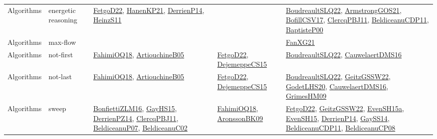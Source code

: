 {\begin{longtable}{lp{3cm}>{\raggedright}p{6cm}>{\raggedright}p{6cm}p{8cm}}
Algorithms & energetic reasoning & \href{articles/FetgoD22.pdf}{FetgoD22}\cite{FetgoD22}, \href{papers/HanenKP21.pdf}{HanenKP21}\cite{HanenKP21}, \href{papers/DerrienP14.pdf}{DerrienP14}\cite{DerrienP14}, \href{papers/HeinzS11.pdf}{HeinzS11}\cite{HeinzS11} &  & \href{papers/BoudreaultSLQ22.pdf}{BoudreaultSLQ22}\cite{BoudreaultSLQ22}, \href{papers/ArmstrongGOS21.pdf}{ArmstrongGOS21}\cite{ArmstrongGOS21}, \href{papers/BofillCSV17.pdf}{BofillCSV17}\cite{BofillCSV17}, \href{papers/ClercqPBJ11.pdf}{ClercqPBJ11}\cite{ClercqPBJ11}, \href{articles/BeldiceanuCDP11.pdf}{BeldiceanuCDP11}\cite{BeldiceanuCDP11}, \href{articles/BaptisteP00.pdf}{BaptisteP00}\cite{BaptisteP00}\\
Algorithms & max-flow &  &  & \href{articles/FanXG21.pdf}{FanXG21}\cite{FanXG21}\\
Algorithms & not-first & \href{articles/FahimiOQ18.pdf}{FahimiOQ18}\cite{FahimiOQ18}, \href{papers/ArtiouchineB05.pdf}{ArtiouchineB05}\cite{ArtiouchineB05} & \href{articles/FetgoD22.pdf}{FetgoD22}\cite{FetgoD22}, \href{papers/DejemeppeCS15.pdf}{DejemeppeCS15}\cite{DejemeppeCS15} & \href{papers/BoudreaultSLQ22.pdf}{BoudreaultSLQ22}\cite{BoudreaultSLQ22}, \href{papers/CauwelaertDMS16.pdf}{CauwelaertDMS16}\cite{CauwelaertDMS16}\\
Algorithms & not-last & \href{articles/FahimiOQ18.pdf}{FahimiOQ18}\cite{FahimiOQ18}, \href{papers/ArtiouchineB05.pdf}{ArtiouchineB05}\cite{ArtiouchineB05} & \href{articles/FetgoD22.pdf}{FetgoD22}\cite{FetgoD22}, \href{papers/DejemeppeCS15.pdf}{DejemeppeCS15}\cite{DejemeppeCS15} & \href{papers/BoudreaultSLQ22.pdf}{BoudreaultSLQ22}\cite{BoudreaultSLQ22}, \href{papers/GeitzGSSW22.pdf}{GeitzGSSW22}\cite{GeitzGSSW22}, \href{papers/GodetLHS20.pdf}{GodetLHS20}\cite{GodetLHS20}, \href{papers/CauwelaertDMS16.pdf}{CauwelaertDMS16}\cite{CauwelaertDMS16}, \href{papers/GrimesHM09.pdf}{GrimesHM09}\cite{GrimesHM09}\\
Algorithms & sweep & \href{papers/BonfiettiZLM16.pdf}{BonfiettiZLM16}\cite{BonfiettiZLM16}, \href{papers/GayHS15.pdf}{GayHS15}\cite{GayHS15}, \href{papers/DerrienPZ14.pdf}{DerrienPZ14}\cite{DerrienPZ14}, \href{papers/ClercqPBJ11.pdf}{ClercqPBJ11}\cite{ClercqPBJ11}, \href{papers/BeldiceanuP07.pdf}{BeldiceanuP07}\cite{BeldiceanuP07}, \href{papers/BeldiceanuC02.pdf}{BeldiceanuC02}\cite{BeldiceanuC02} & \href{articles/FahimiOQ18.pdf}{FahimiOQ18}\cite{FahimiOQ18}, \href{papers/AronssonBK09.pdf}{AronssonBK09}\cite{AronssonBK09} & \href{articles/FetgoD22.pdf}{FetgoD22}\cite{FetgoD22}, \href{papers/GeitzGSSW22.pdf}{GeitzGSSW22}\cite{GeitzGSSW22}, \href{articles/EvenSH15a.pdf}{EvenSH15a}\cite{EvenSH15a}, \href{papers/EvenSH15.pdf}{EvenSH15}\cite{EvenSH15}, \href{papers/DerrienP14.pdf}{DerrienP14}\cite{DerrienP14}, \href{papers/GaySS14.pdf}{GaySS14}\cite{GaySS14}, \href{articles/BeldiceanuCDP11.pdf}{BeldiceanuCDP11}\cite{BeldiceanuCDP11}, \href{papers/BeldiceanuCP08.pdf}{BeldiceanuCP08}\cite{BeldiceanuCP08}\\

\end{longtable}}
